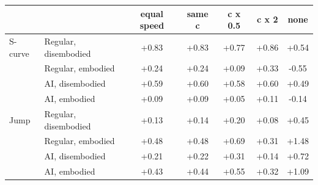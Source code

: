 \begin{tabular}{llccccc}\toprule
 & & equal speed & same c & c x 0.5 & c x 2 & none\\\midrule
S-curve & Regular, disembodied & +0.83 & +0.83 & +0.77 & +0.86 & +0.54\\
 & Regular, embodied & +0.24 & +0.24 & +0.09 & +0.33 & -0.55\\
 & AI, disembodied & +0.59 & +0.60 & +0.58 & +0.60 & +0.49\\
 & AI, embodied & +0.09 & +0.09 & +0.05 & +0.11 & -0.14\\
\midrule
Jump & Regular, disembodied & +0.13 & +0.14 & +0.20 & +0.08 & +0.45\\
 & Regular, embodied & +0.48 & +0.48 & +0.69 & +0.31 & +1.48\\
 & AI, disembodied & +0.21 & +0.22 & +0.31 & +0.14 & +0.72\\
 & AI, embodied & +0.43 & +0.44 & +0.55 & +0.32 & +1.09\\
\bottomrule\end{tabular}
